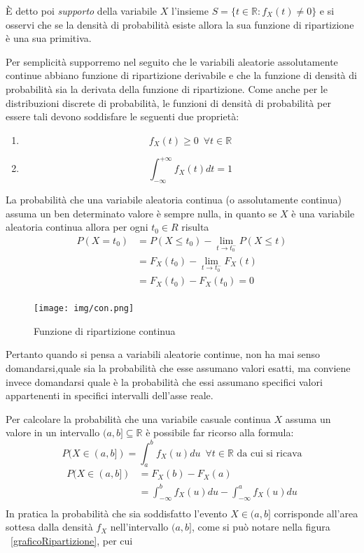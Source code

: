 \documentclass[a4paper,12pt, oneside]{book}
\newcommand{\numberset}{\mathbb}
\newcommand{\R}{\numberset{R}}
\begin{document}
È detto poi \emph{supporto} della variabile $X$ l'insieme $S = \{t \in \R : f_X(t) \neq 0\}$
e si osservi che se la densità di probabilità esiste allora la sua funzione di ripartizione è una sua
primitiva.

Per semplicità supporremo nel seguito che le variabili aleatorie assolutamente continue abbiano funzione
di ripartizione derivabile e che la funzione di densità di probabilità sia la derivata della funzione di ripartizione.\newline
Come anche per le distribuzioni discrete di probabilità, le funzioni di densità di probabilità 
per essere tali devono soddisfare le seguenti due proprietà:
\begin{enumerate}
    \item \[f_X(t) \geq 0\,\,\, \forall t \in \R\]
    \item \[\int _{-\infty}^{+\infty} f_X(t)dt = 1\]
\end{enumerate}
La probabilità che una variabile aleatoria continua (o assolutamente continua) assuma un ben determinato valore
è sempre nulla, in quanto se $X$ è una variabile aleatoria continua allora per ogni $t_0 \in R$ risulta
\[ \begin{split}
    P(X = t_0) & = P(X \leq t_0) - \lim _{t \to t_0^-} P(X \leq t) \\
               & = F_X(t_0) - \lim_{t \to t_0^-} F_X(t) \\
               & = F_X(t_0) - F_X(t_0) = 0\\
   \end{split} \]

\begin{figure}
    \centering
    \caption{Funzione di ripartizione continua}
    \label{img:ripartizioneContinua}
    \texttt{[image: img/con.png]}
\end{figure}
Pertanto quando si pensa a variabili aleatorie continue, non ha mai senso domandarsi,quale sia la probabilità
che esse assumano valori esatti, ma conviene invece domandarsi quale è la probabilità che essi assumano
specifici valori appartenenti in specifici intervalli dell'asse reale.

Per calcolare la probabilità che una variabile casuale continua $X$ assuma un valore in un intervallo 
$(a,b] \subseteq \R$ è possibile far ricorso alla formula:
\[ P(X \in (a,b]) = \int _a ^b f_X(u)du\,\,\, \forall t \in \R \,\, \text{da cui si ricava}\]
\[ \begin{split}
    P(X \in (a, b]) & = F_X(b) - F_X(a) \\
                    & = \int_{-\infty}^b f_X(u)du - \int_{-\infty}^a f_X(u)du\\
   \end{split} \]
In pratica la probabilità che sia soddisfatto l'evento $X\in(a,b]$ corrisponde all'area sottesa
dalla densità $f_X$ nell'intervallo $(a,b]$, come si può notare nella figura ~\ref{graficoRipartizione}, per cui
\end{document}
